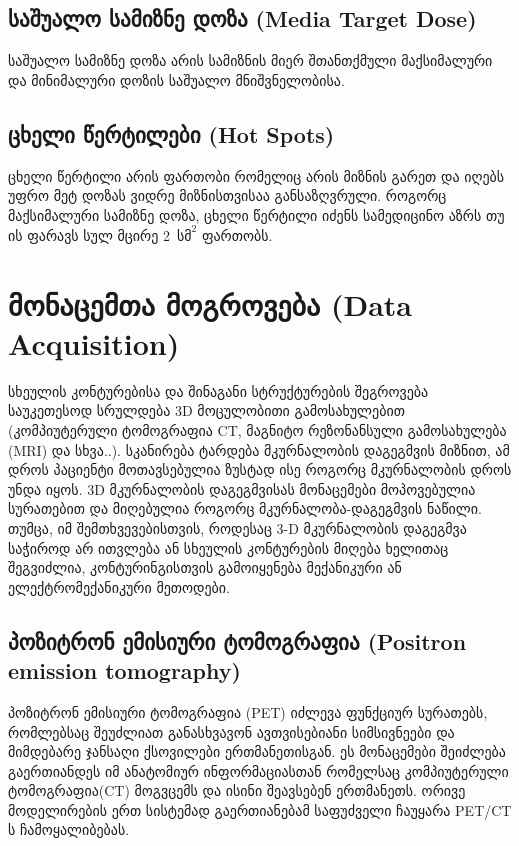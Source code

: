 \documentclass[12pt,a4paper,]{report}
\begin{document}
\section{საშუალო სამიზნე დოზა (Media Target Dose)}
საშუალო სამიზნე დოზა არის სამიზნის მიერ შთანთქმული მაქსიმალური და მინიმალური დოზის საშუალო მნიშვნელობისა.  

\section{ცხელი წერტილები (Hot Spots)}
ცხელი წერტილი არის ფართობი რომელიც არის მიზნის გარეთ და იღებს უფრო მეტ დოზას ვიდრე მიზნისთვისაა განსაზღვრული. როგორც მაქსიმალური სამიზნე დოზა, ცხელი წერტილი იძენს სამედიცინო აზრს თუ ის ფარავს სულ მცირე 2~$\text{სმ}^2$ ფართობს.

\chapter{მონაცემთა მოგროვება (Data Acquisition)}
სხეულის კონტურებისა და შინაგანი სტრუქტურების შეგროვება საუკეთესოდ სრულდება 3D მოცულობითი გამოსახულებით (კომპიუტერული ტომოგრაფია CT, მაგნიტო რეზონანსული გამოსახულება (MRI) და სხვა..). სკანირება ტარდება მკურნალობის დაგეგმვის მიზნით, ამ დროს პაციენტი მოთავსებულია ზუსტად ისე როგორც მკურნალობის დროს უნდა იყოს. 3D მკურნალობის დაგეგმვისას მონაცემები მოპოვებულია სურათებით და მიღებულია როგორც მკურნალობა-დაგეგმვის ნაწილი. თუმცა, იმ შემთხვევებისთვის, როდესაც 3-D მკურნალობის დაგეგმვა საჭიროდ არ ითვლება ან სხეულის კონტურების მიღება ხელითაც შეგვიძლია, კონტურინგისთვის გამოიყენება მექანიკური ან ელექტრომექანიკური მეთოდები.

\section{პოზიტრონ ემისიური ტომოგრაფია (Positron emission tomography)}
პოზიტრონ ემისიური ტომოგრაფია (PET) იძლევა ფუნქციურ სურათებს, რომლებსაც შეუძლიათ განასხვავონ ავთვისებიანი სიმსივნეები და მიმდებარე ჯანსაღი ქსოვილები ერთმანეთისგან. ეს მონაცემები შეიძლება გაერთიანდეს იმ ანატომიურ ინფორმაციასთან რომელსაც კომპიუტერული ტომოგრაფია(CT) მოგვცემს და ისინი შეავსებენ ერთმანეთს. ორივე მოდელირების ერთ სისტემად გაერთიანებამ საფუძველი ჩაუყარა PET/CT ს ჩამოყალიბებას.
\end{document}
